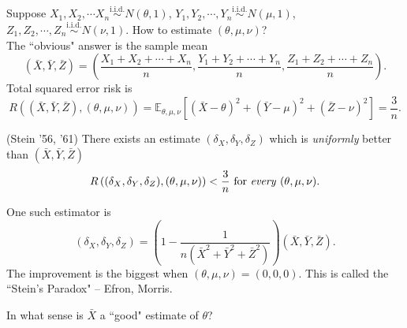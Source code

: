 \documentclass[a4paper]{article}
\begin{document}
\begin{eg*}
	Suppose $X_1,X_2,\cdots X_n \stackrel{\text{i.i.d.}}{\sim} N(\theta,1)$, $Y_1,Y_2,\cdots,Y_n \stackrel{\text{i.i.d.}}{\sim} N(\mu,1)$, $Z_1,Z_2,\cdots,Z_n \stackrel{\text{i.i.d.}}{\sim} N(\nu,1)$. How to estimate $(\theta,\mu,\nu)$? \\
	The ``obvious" answer is the sample mean
	\begin{equation*}
		(\bar{X},\bar{Y},\bar{Z}) = \left(\frac{X_1+X_2+\cdots+X_n}{n},\frac{Y_1+Y_2+\cdots+Y_n}{n},\frac{Z_1+Z_2+\cdots+Z_n}{n}\right).
	\end{equation*}
	Total squared error risk is
	\begin{equation*}
		R\left((\bar{X},\bar{Y},\bar{Z}),(\theta,\mu,\nu)\right) = \mathbb{E}_{\theta,\mu,\nu}\left[(\bar{X}-\theta)^2+(\bar{Y}-\mu)^2+(\bar{Z}-\nu)^2\right] =\frac{3}{n}.
	\end{equation*}
	\begin{thm*}(Stein '56, '61)
		There exists an estimate $(\delta_X,\delta_Y,\delta_Z)$ which is \emph{uniformly} better than $(\bar{X},\bar{Y},\bar{Z})$
		\begin{equation*}
			R\left((\delta_X,\delta_Y,\delta_Z),(\theta,\mu,\nu)\right) < \frac{3}{n} \text{ for \emph{every} } (\theta,\mu,\nu).
		\end{equation*}
	\end{thm*}
	\noindent One such estimator is
	\begin{equation*}
		(\delta_X,\delta_Y,\delta_Z) = \left(1-\frac{1}{n(\bar{X}^2+\bar{Y}^2+\bar{Z}^2)}\right)(\bar{X},\bar{Y},\bar{Z}).
	\end{equation*}
	The improvement is the biggest when $(\theta,\mu,\nu) = (0,0,0)$. This is called the ``Stein's Paradox" -- Efron, Morris.
\end{eg*}

\begin{question*}
	In what sense is $\bar{X}$ a ``good" estimate of $\theta$?
\end{question*}
\end{document}
